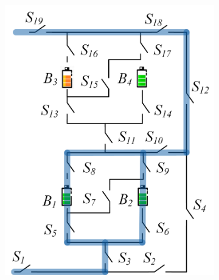 \documentclass{article}
\providecommand{\DIFaddbeginFL}{} %
\providecommand{\DIFaddendFL}{} %
\providecommand{\DIFdelbeginFL}{} %
\providecommand{\DIFdelendFL}{} %
\newcommand{\DIFscaledelfig}{0.5}
\newlength{\DIFdelgraphicswidth} %
\newlength{\DIFdelgraphicsheight} %
\newcommand{\DIFaddincludegraphics}[2][]{{\color{blue}\fbox{\DIFOincludegraphics[#1]{#2}}}} %
\newcommand{\DIFdelincludegraphics}[2][]{%
\sbox{\DIFdelgraphicsbox}{\DIFOincludegraphics[#1]{#2}}%
\settoboxwidth{\DIFdelgraphicswidth}{\DIFdelgraphicsbox} %
\settoboxtotalheight{\DIFdelgraphicsheight}{\DIFdelgraphicsbox} %
\scalebox{\DIFscaledelfig}{%
\parbox[b]{\DIFdelgraphicswidth}{\usebox{\DIFdelgraphicsbox}\\[-\baselineskip] \rule{\DIFdelgraphicswidth}{0em}}\llap{\resizebox{\DIFdelgraphicswidth}{\DIFdelgraphicsheight}{%
\setlength{\unitlength}{\DIFdelgraphicswidth}%
\begin{picture}(1,1)%
\thicklines\linethickness{2pt} %
{\color[rgb]{1,0,0}\put(0,0){\framebox(1,1){}}}%
{\color[rgb]{1,0,0}\put(0,0){\line( 1,1){1}}}%
{\color[rgb]{1,0,0}\put(0,1){\line(1,-1){1}}}%
\end{picture}%
}\hspace*{3pt}}} %
} %
\DeclareRobustCommand{\DIFaddbeginFL}{\DIFOaddbeginFL \let\includegraphics\DIFaddincludegraphics} %
\DeclareRobustCommand{\DIFaddendFL}{\DIFOaddendFL \let\includegraphics\DIFOincludegraphics} %
\DeclareRobustCommand{\DIFdelbeginFL}{\DIFOdelbeginFL \let\includegraphics\DIFdelincludegraphics} %
\DeclareRobustCommand{\DIFdelendFL}{\DIFOaddendFL \let\includegraphics\DIFOincludegraphics} %
\begin{document}
\begin{figure}[htbp]
    \centering
    \begin{subfigure}[b]{0.31\textwidth}
        \DIFdelbeginFL %
\DIFdelendFL \DIFaddbeginFL \includegraphics[width=\textwidth]{e2f2-isolate-1.png}
        \DIFaddendFL \caption{}
        \label{fig:my-isolated-1}
    \end{subfigure}
    \hspace{0.02\textwidth}
    \begin{subfigure}[b]{0.31\textwidth}
        \DIFdelbeginFL %

\end{subfigure}
\end{figure}
\end{document}
